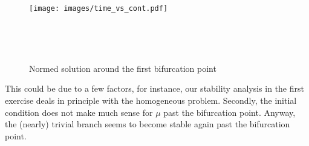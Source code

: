 \documentclass[a4paper]{article}
\begin{document}
  \begin{figure}[h]
    \centerline{\texttt{[image: images/time\_vs\_cont.pdf]}}~
    \caption{Normed solution around the first bifurcation point}~
    \label{fig:soln}
  \end{figure}

  This could be due to a few factors, for instance, our stability analysis in the first exercise deals in principle with the homogeneous problem. Secondly, the initial condition does not make much sense for $\mu$ past the bifurcation point. Anyway, the (nearly) trivial branch seems to become stable again past the bifurcation point.
\end{document}
